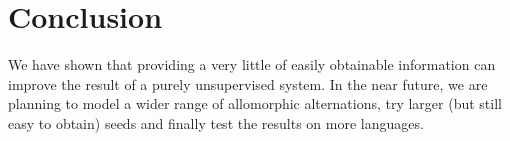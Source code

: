 \documentclass[11pt]{article}
\begin{document}
\section{Conclusion}

We have shown that providing a very little of easily obtainable information can improve the result of a purely unsupervised system. In the near future, we are planning to model a wider range of allomorphic alternations, try larger (but still easy to obtain) seeds and finally test the results on more languages.








{}
\end{document}
